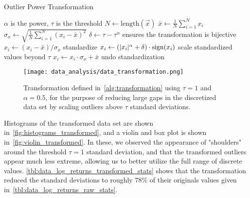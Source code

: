 \begin{algorithm}
\caption{Outlier Power Transformation}
\begin{algorithmic}[1]
            \Comment $\alpha$ is the power, $\tau$ is the threshold
        \State $N \gets \text{length}(\vec{x})$
        \State $\bar{x} \gets \frac{1}{N} \sum_{i=1}^{N} x_i$
        \State $\sigma_{x} \gets \sqrt{\frac{1}{N} \sum_{i=1}^{N} (x_i - \bar{x})^2}$
        \State $\delta \gets \tau - \tau^\alpha$
            \Comment ensures the transformation is bijective
            \State $x_i \gets (x_i - \bar{x}) / \sigma_x$
                \Comment standardize
                \State $x_i \gets (\lvert x_i\rvert^\alpha + \delta) \cdot \text{sign}(x_i)$
                    \Comment scale standardized values beyond $\tau$
            \EndIf
            \State $x_i \gets x_i \cdot \sigma_x + \bar{x}$
                \Comment undo standardization
        \EndFor
    \EndProcedure
\end{algorithmic}
\label{alg:transformation}
\end{algorithm}

\begin{figure}[!htb]
    \begin{center}
        \texttt{[image: data\_analysis/data\_transformation.png]}
    \end{center}
    \caption{Transformation defined in~\cref{alg:transformation} using \( \tau = 1 \) and \( \alpha = 0.5 \), for the purpose of reducing large gaps in the discretized data set by scaling outliers above \( \tau \) standard deviations.}
    \label{fig:data_transformation}
\end{figure}

Histograms of the transformed data set are shown in~\cref{fig:histograms_transformed}, and a violin and box plot is shown in~\cref{fig:violin_transformed}.
In these, we observed the appearance of "shoulders" around the threshold \( \tau = 1 \) standard deviation, and that the transformed outliers appear much less extreme, allowing us to better utilize the full range of discrete values.
\cref{tbl:data_log_returns_transformed_stats} shows that the transformation reduced the standard deviations to roughly \( 78\% \) of their originals values given in~\cref{tbl:data_log_returns_raw_stats}.

